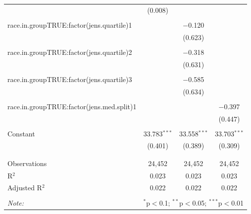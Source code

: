 \begin{table}[!htbp]
\begin{tabular}{@{\extracolsep{5pt}}lccc}
  & (0.008) &  &  \\ 
  & & & \\ 
 race.in.groupTRUE:factor(jens.quartile)1 &  & $-$0.120 &  \\ 
  &  & (0.623) &  \\ 
  & & & \\ 
 race.in.groupTRUE:factor(jens.quartile)2 &  & $-$0.318 &  \\ 
  &  & (0.631) &  \\ 
  & & & \\ 
 race.in.groupTRUE:factor(jens.quartile)3 &  & $-$0.585 &  \\ 
  &  & (0.634) &  \\ 
  & & & \\ 
 race.in.groupTRUE:factor(jens.med.split)1 &  &  & $-$0.397 \\ 
  &  &  & (0.447) \\ 
  & & & \\ 
 Constant & 33.783$^{***}$ & 33.558$^{***}$ & 33.703$^{***}$ \\ 
  & (0.401) & (0.389) & (0.309) \\ 
  & & & \\ 
\hline \\[-1.8ex] 
Observations & 24,452 & 24,452 & 24,452 \\ 
R$^{2}$ & 0.023 & 0.023 & 0.023 \\ 
Adjusted R$^{2}$ & 0.022 & 0.022 & 0.022 \\ 
\hline 
\hline \\[-1.8ex] 
\textit{Note:}  & \multicolumn{3}{r}{$^{*}$p$<$0.1; $^{**}$p$<$0.05; $^{***}$p$<$0.01} \\ 
\end{tabular} 
\end{table} 
